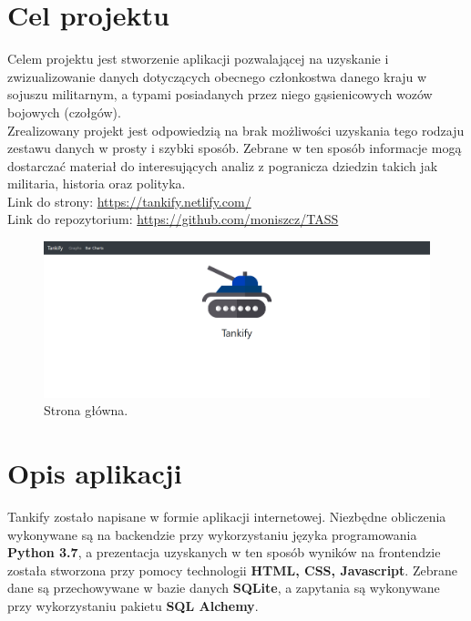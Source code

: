 \newpage
\section{Cel projektu}
Celem projektu jest stworzenie aplikacji pozwalającej na uzyskanie i zwizualizowanie danych dotyczących obecnego członkostwa danego kraju w sojuszu militarnym, a typami posiadanych przez niego gąsienicowych wozów bojowych (czołgów).\\
\indent Zrealizowany projekt jest odpowiedzią na brak możliwości uzyskania tego rodzaju zestawu danych w prosty i szybki sposób. Zebrane w ten sposób informacje mogą dostarczać materiał do interesujących analiz z pogranicza dziedzin takich jak militaria, historia oraz polityka.\\
Link do strony: \url{https://tankify.netlify.com/}\\
Link do repozytorium: \url{https://github.com/moniszcz/TASS}
\begin{figure}[H]
    \centering \includegraphics[width=1.0\linewidth]{tex/landing_page.PNG}
    \caption{Strona główna.}
    \label{fig:landing_page}
\end{figure}
\section{Opis aplikacji}
Tankify zostało napisane w formie aplikacji internetowej.
Niezbędne obliczenia wykonywane są na backendzie przy wykorzystaniu języka programowania \textbf{Python 3.7}, a prezentacja uzyskanych w ten sposób wyników na frontendzie została stworzona przy pomocy technologii \textbf{HTML, CSS, Javascript}. Zebrane dane są przechowywane w bazie danych \textbf{SQLite}, a zapytania są wykonywane przy wykorzystaniu pakietu \textbf{SQL Alchemy}.
\newpage
